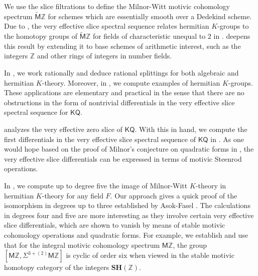 \documentclass[11pt,hyp,english]{article}
\newcommand{\Z}{\mathbb{Z}}
\newcommand{\KQ}{\mathsf{KQ}}
\newcommand{\MZ}{\mathsf{M}\Z}
\newcommand{\cHZ}{\wt{{\mathsf{M}}}{\Z}}
\newcommand{\SH}{\mathbf{SH}}
\newcommand{\wt}[1]{\widetilde{#1}}
\theoremstyle{definition}
\begin{document}
We use the slice filtrations to define the Milnor-Witt motivic cohomology 
spectrum $\cHZ$ for schemes which are essentially smooth over a Dedekind scheme.
Due to \cite{Bachmann}, 
the very effective slice spectral sequence relates hermitian $K$-groups to the homotopy 
groups of $\cHZ$ for fields of characteristic unequal to $2$ in \cite{2020arXiv200406634B}.
 deepens this result by extending it to base schemes of arithmetic interest, 
such as the integers $\mathbb{Z}$ and other rings of integers in number fields. 
\vspace{0.1in}

In , 
we work rationally and deduce rational splittings for both algebraic and hermitian $K$-theory.
Moreover, 
in , 
we compute examples of hermitian $K$-groups.
These applications are elementary and practical in the sense that there are no obstructions 
in the form of nontrivial differentials in the very effective slice spectral sequence for $\KQ$.
\vspace{0.1in}

 analyzes the very effective zero slice of $\KQ$.
With this in hand, 
we compute the first differentials in the very effective 
slice spectral sequence of $\KQ$ in .
As one would hope based on the proof of Milnor's conjecture on quadratic forms in \cite{RO:slices},
the very effective slice differentials can be expressed in terms of motivic Steenrod operations.
\vspace{0.1in}

In , 
we compute up to degree five the image of Milnor-Witt $K$-theory in 
hermitian $K$-theory for any field $F$. 
Our approach gives a quick proof of the isomorphism in degrees up to three 
established by Asok-Fasel \cite{KO-map}.
The calculations in degrees four and five are more interesting as they involve 
certain very effective slice differentials, which are shown to vanish by means of 
stable motivic cohomology operations and quadratic forms.
For example, 
we establish and use that for the integral motivic cohomology spectrum $\MZ$,  
the group $[\MZ,\Sigma^{3+(2)}\MZ]$ is cyclic of order six when viewed in the 
stable motivic homotopy category of the integers $\SH(\Z)$.
\vspace{0.1in}
\end{document}
